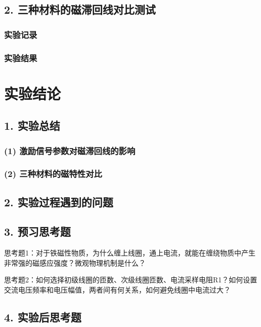 \documentclass[12pt,a4paper]{article}
\newcommand{\recordblank}[1]{\par\vspace*{#1}\par}
\begin{document}
\subsection*{2. 三种材料的磁滞回线对比测试}

\subsubsection*{实验记录}
\recordblank{5.0cm}
\subsubsection*{实验结果}
\recordblank{9.8cm}
\section*{实验结论}
\subsection*{1. 实验总结}
\subsubsection*{(1) 激励信号参数对磁滞回线的影响}
\recordblank{3.5cm}
\subsubsection*{(2) 三种材料的磁特性对比}
\recordblank{3.5cm}
\subsection*{2. 实验过程遇到的问题}
\recordblank{5.0cm}
\subsection*{3. 预习思考题}

\begin{questionbox}
思考题1：对于铁磁性物质，为什么缠上线圈，通上电流，就能在缠绕物质中产生非常强的磁感应强度？微观物理机制是什么？
\end{questionbox}
\recordblank{4cm}
\begin{questionbox}
思考题2：如何选择初级线圈的匝数、次级线圈匝数、电流采样电阻R1？如何设置交流电压频率和电压幅值，两者间有何关系，如何避免线圈中电流过大？
\end{questionbox}
\recordblank{4cm}
\subsection*{4. 实验后思考题}
\end{document}
